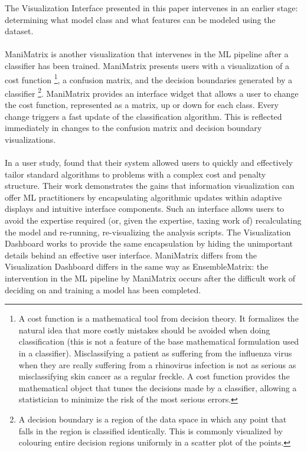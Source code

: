 \documentclass{sigchi}
\begin{document}
%
The Visualization Interface presented in this paper intervenes in an earlier stage: determining what model class and what features can be modeled using the dataset. %
%
\\\\
%
ManiMatrix \cite{kapoor2010interactive} is another visualization that intervenes in the ML pipeline after a classifier has been trained. %
%
ManiMatrix presents users with a visualization of a cost function%
%
\footnote{A cost function is a mathematical tool from decision theory. It formalizes the natural idea that more costly mistakes should be avoided when doing classification (this is not a feature of the base mathematical formulation used in a classifier). %
Misclassifying a patient as suffering from the influenza virus when they are really suffering from a rhinovirus infection is not as serious as misclassifying skin cancer as a regular freckle. %
A cost function provides the mathematical object that tunes the decisions made by a classifier, allowing a statistician to minimize the risk of the most serious errors.}, %
%
a confusion matrix, and the decision boundaries generated by a classifier%
%
\footnote{A decision boundary is a region of the data space in which any point that falls in the region is classified identically. This is commonly visualized by colouring entire decision regions uniformly in a scatter plot of the points.}. %
%
ManiMatrix provides an interface widget that allows a user to change the cost function, represented as a matrix, up or down for each class. %
%
Every change triggers a fast update of the classification algorithm. %
%
This is reflected immediately in changes to the confusion matrix and decision boundary visualizations. %
%
\\\\
%
In a user study, \cite{kapoor2010interactive} found that their system allowed users to quickly and effectively tailor standard algorithms to problems with a complex cost and penalty structure. %
%
Their work demonstrates the gains that information visualization can offer ML practitioners by encapsulating algorithmic updates within adaptive displays and intuitive interface components. %
%
Such an interface allows users to avoid the expertise required (or, given the expertise, taxing work of) recalculating the model and re-running, re-visualizing the analysis scripts. %
%
The Visualization Dashboard works to provide the same encapsulation by hiding the unimportant details behind an effective user interface. %
%
ManiMatrix differs from the Visualization Dashboard differs in the same way as EnsembleMatrix: the intervention in the ML pipeline by ManiMatrix occurs after the difficult work of deciding on and training a model has been completed.%
%
%
\end{document}
